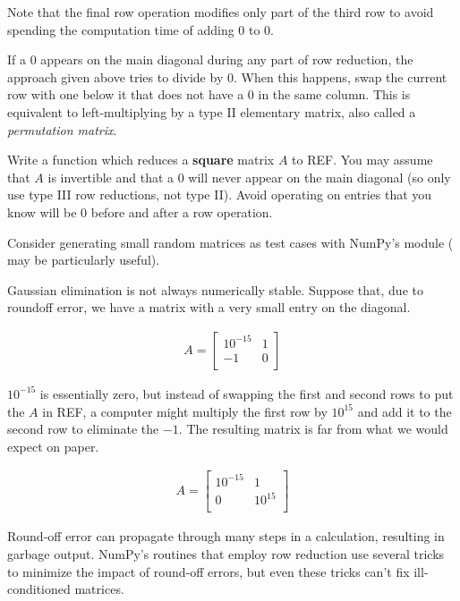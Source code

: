 Note that the final row operation modifies only part of the third row to avoid spending the computation time of adding $0$ to $0$.

If a $0$ appears on the main diagonal during any part of row reduction, the approach given above tries to divide by $0$.
When this happens, swap the current row with one below it that does not have a $0$ in the same column.
This is equivalent to left-multiplying by a type II elementary matrix, also called a \emph{permutation matrix}.

\begin{problem} %
Write a function which reduces a \textbf{square} matrix $A$ to REF.
You may assume that $A$ is invertible and that a $0$ will never appear on the main diagonal (so only use type III row reductions, not type II).
Avoid operating on entries that you know will be $0$ before and after a row operation.

Consider generating small random matrices as test cases with NumPy's  module ( may be particularly useful).
\end{problem}

\begin{warn} %
Gaussian elimination is not always numerically stable.
Suppose that, due to roundoff error, we have a matrix with a very small entry on the diagonal.

\begin{align*}
A = \left[\begin{array}{cc}
10^{-15} & 1 \\
-1 & 0 \\
\end{array}\right]
\end{align*}

$10^{-15}$ is essentially zero, but instead of swapping the first and second rows to put the $A$ in REF, a computer might multiply the first row by $10^{15}$ and add it to the second row to eliminate the $-1$.
The resulting matrix is far from what we would expect on paper.

\begin{align*}
A = \left[\begin{array}{cc}
10^{-15} & 1 \\
0 & 10^{15} \\
\end{array}\right]
\end{align*}

Round-off error can propagate through many steps in a calculation, resulting in garbage output.
NumPy's routines that employ row reduction use several tricks to minimize the impact of round-off errors, but even these tricks can't fix ill-conditioned matrices.
\end{warn}

